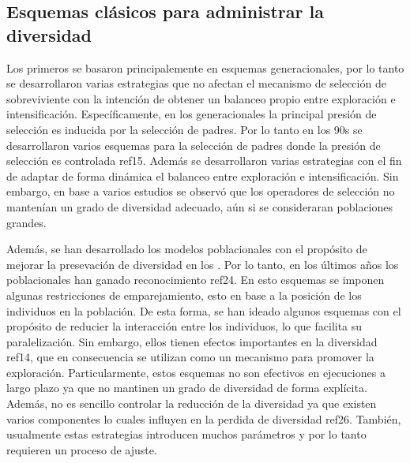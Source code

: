 \subsection{Esquemas clásicos para administrar la diversidad}

Los primeros \EAS{} se basaron principalemente en esquemas generacionales, por lo tanto se desarrollaron varias estrategias que no afectan el mecanismo de selección de sobreviviente con la intención de obtener un balanceo propio entre exploración e intensificación.
%
Específicamente, en los \EAS{} generacionales la principal presión de selección es inducida por la selección de padres.
%
%
Por lo tanto en los 90s se desarrollaron varios esquemas para la selección de padres donde la presión de selección es controlada ref15.
%
Además se desarrollaron varias estrategias con el fin de adaptar de forma dinámica el balanceo entre exploración e intensificación.
%
Sin embargo, en base a varios estudios se observó que los operadores de selección no mantenían un grado de diversidad adecuado, aún si se consideraran poblaciones grandes.
%

Además, se han desarrollado los modelos poblacionales con el propósito de mejorar la presevación de diversidad en los \EAS{}.
%
Por lo tanto, en los últimos años los \EAS{} poblacionales han ganado reconocimiento ref24.
%
En esto esquemas se imponen algunas restricciones de emparejamiento, esto en base a la posición de los individuos en la población.
%
De esta forma, se han ideado algunos esquemas con el propósito de reducier la interacción entre los individuos, lo que facilita su paralelización.
%
Sin embargo, ellos tienen efectos importantes en la diversidad ref14, que en consecuencia se utilizan como un mecanismo para promover la exploración.
%
Particularmente, estos esquemas no son efectivos en ejecuciones a largo plazo ya que no mantinen un grado de diversidad de forma explícita.
%
Además, no es sencillo controlar la reducción de la diversidad ya que existen varios componentes lo cuales influyen en la perdida de diversidad ref26.
%
También, usualmente estas estrategias introducen muchos parámetros y por lo tanto requieren un proceso de ajuste.

